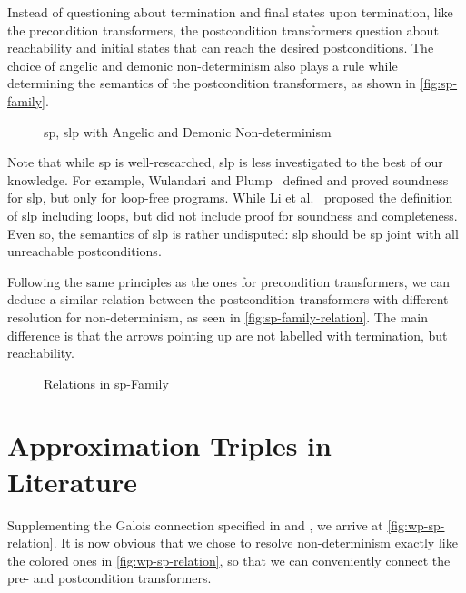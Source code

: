 Instead of questioning about termination and final states upon termination, like the precondition transformers, the postcondition transformers question about reachability and initial states that can reach the desired postconditions. 
The choice of angelic and demonic non-determinism also plays a rule while determining the semantics of the postcondition transformers, as shown in \autoref{fig:sp-family}. 

\begin{figure}[ht!]\centering
	\hfill

	\hfill
	\caption{sp, slp with Angelic and Demonic Non-determinism}
	\label{fig:sp-family}
\end{figure}

Note that while sp is well-researched, slp is less investigated to the best of our knowledge. 
For example, Wulandari and Plump~\cite{wulandari2020VerifyingGraphPrograms} defined and proved soundness for slp, but only for loop-free programs. 
While Li et al.~\cite{li2011NonlinearMathematicsUncertainty} proposed the definition of slp including loops, but did not include proof for soundness and completeness. 
Even so, the semantics of slp is rather undisputed: slp should be sp joint with all unreachable postconditions. 

Following the same principles as the ones for precondition transformers, we can deduce a similar relation between the postcondition transformers with different resolution for non-determinism, as seen in \autoref{fig:sp-family-relation}. 
The main difference is that the arrows pointing up are not labelled with termination, but reachability. 

\begin{figure}[ht]
	\centering
	
	\caption{Relations in sp-Family}
	\label{fig:sp-family-relation}
\end{figure}

\section{Approximation Triples in Literature}\label{sec:literature} 
Supplementing the Galois connection specified in  and , we arrive at \autoref{fig:wp-sp-relation}. 
It is now obvious that we chose to resolve non-determinism exactly like the colored ones in \autoref{fig:wp-sp-relation}, so that we can conveniently connect the pre- and postcondition transformers. 

